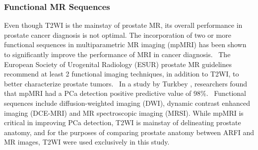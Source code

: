 \subsubsection{Functional MR Sequences}
Even though T2WI is the mainstay of prostate MR, its overall performance in
prostate cancer diagnosis is not optimal. The incorporation of two or more
functional sequences in multiparametric MR imaging (mpMRI) has been shown to
significantly improve the performance of MRI in cancer
diagnosis.~\cite{Turkbey2012}  The European Society of Urogenital Radiology
(ESUR) prostate MR guidelines recommend at least 2 functional imaging
techniques, in addition to T2WI, to better characterize prostate
tumors.~\cite{Barentsz2012} In a study by Turkbey \etal, researchers found that
mpMRI had a PCa detection positive predictive value of 98\%.~\cite{Turkbey2012}
Functional sequences include diffusion-weighted imaging (DWI), dynamic contrast
enhanced imaging (DCE-MRI) and MR spectroscopic imaging (MRSI).  While mpMRI is
critical in improving PCa detection, T2WI is mainstay of delineating prostate
anatomy, and for the purposes of comparing prostate anatomy between ARFI and MR
images, T2WI were used exclusively in this study.

%
%
